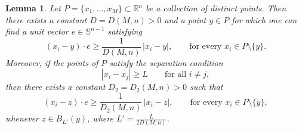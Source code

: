 \documentclass[10pt,a4paper]{amsart}
\newtheorem{lemma}{Lemma}
\begin{document}
\begin{lemma}\label{lemma ch}
Let \(P=\{x_1,\dots,x_M\}\subset \mathbb{R}^n\) be a collection of distinct points. 
Then there exists a constant \(D=D(M,n)>0\) and a point \(y\in P\) for which one can find a unit vector \(e\in \mathbb{S}^{n-1}\) satisfying
\begin{equation}\label{eq hyper bound}
(x_i-y)\cdot e 
\ge 
\frac{1}{D(M,n)}\,|x_i-y|,
\qquad 
\text{for every } x_i\in P\setminus\{y\}.
\end{equation}
Moreover, if the points of \(P\) satisfy the separation condition
\[
|x_i-x_j|\ge L 
\qquad \text{for all } i\ne j,
\]
then there exists a constant \(D_2=D_2(M,n)>0\) such that
\begin{equation}\label{eq hyper bound neigh}
(x_i-z)\cdot e 
\ge 
\frac{1}{D_2(M,n)}\,|x_i-z|,
\qquad 
\text{for every } x_i\in P\setminus\{y\},
\end{equation}
whenever \(z\in B_{L'}(y)\), where \(L'=\frac{L}{2D(M,n)}\).
\end{lemma}
\end{document}
